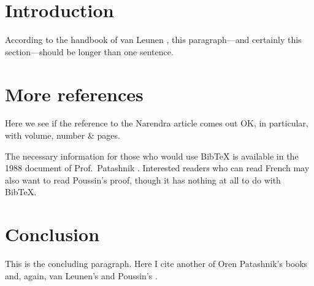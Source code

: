 \documentclass[11pt]{article}
\begin{document}
\section{Introduction}

According to the handbook of van Leunen \cite{vanleunen},
this paragraph---and certainly this
section---should be longer than one sentence.

\section{More references}

Here we see if the reference \cite{Narendra_1990}
to the Narendra article comes out OK, in particular,
with volume, number \& pages.

The necessary information for those who would use BibTeX
is available in the 1988 document of Prof.\ Patashnik \cite{btxdoc}.
Interested readers who can read French may also
want to read Poussin's proof\cite{primes}, though
it has nothing at all to do with BibTeX.

\section{Conclusion}

This is the concluding paragraph.  Here I cite another of
Oren Patashnik's books\cite{btxhak} and, again,
van Leunen's and Poussin's \cite{vanleunen,primes}.



\end{document}
